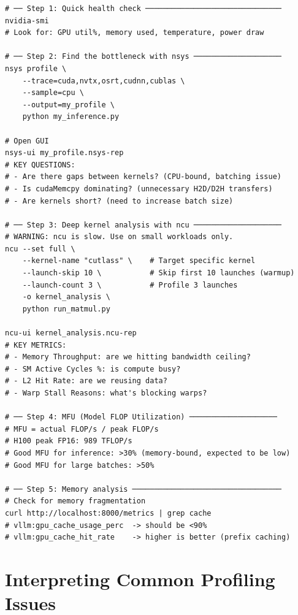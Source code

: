 \documentclass[11pt, twoside, openright]{book}
\begin{document}
\begin{lstlisting}[style=bashstyle, caption={Full GPU profiling workflow}]
# ── Step 1: Quick health check ───────────────────────────────
nvidia-smi
# Look for: GPU util%, memory used, temperature, power draw

# ── Step 2: Find the bottleneck with nsys ────────────────────
nsys profile \
    --trace=cuda,nvtx,osrt,cudnn,cublas \
    --sample=cpu \
    --output=my_profile \
    python my_inference.py

# Open GUI
nsys-ui my_profile.nsys-rep
# KEY QUESTIONS:
# - Are there gaps between kernels? (CPU-bound, batching issue)
# - Is cudaMemcpy dominating? (unnecessary H2D/D2H transfers)
# - Are kernels short? (need to increase batch size)

# ── Step 3: Deep kernel analysis with ncu ────────────────────
# WARNING: ncu is slow. Use on small workloads only.
ncu --set full \
    --kernel-name "cutlass" \    # Target specific kernel
    --launch-skip 10 \           # Skip first 10 launches (warmup)
    --launch-count 3 \           # Profile 3 launches
    -o kernel_analysis \
    python run_matmul.py

ncu-ui kernel_analysis.ncu-rep
# KEY METRICS:
# - Memory Throughput: are we hitting bandwidth ceiling?
# - SM Active Cycles %: is compute busy?
# - L2 Hit Rate: are we reusing data?
# - Warp Stall Reasons: what's blocking warps?

# ── Step 4: MFU (Model FLOP Utilization) ────────────────────
# MFU = actual FLOP/s / peak FLOP/s
# H100 peak FP16: 989 TFLOP/s
# Good MFU for inference: >30% (memory-bound, expected to be low)
# Good MFU for large batches: >50%

# ── Step 5: Memory analysis ──────────────────────────────────
# Check for memory fragmentation
curl http://localhost:8000/metrics | grep cache
# vllm:gpu_cache_usage_perc  -> should be <90%
# vllm:gpu_cache_hit_rate    -> higher is better (prefix caching)
\end{lstlisting}

\section*{Interpreting Common Profiling Issues}
\end{document}
